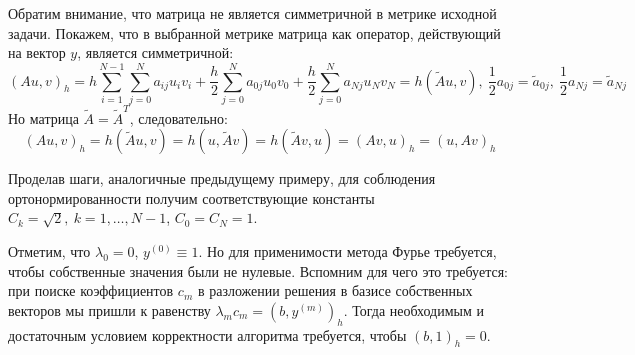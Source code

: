 \begin{example}
  Обратим внимание, что матрица не является симметричной в метрике
  исходной задачи. Покажем, что в выбранной метрике матрица как
  оператор, действующий на вектор $y$, является симметричной:
  \[(Au,v)_h=h\sum_{i=1}^{N-1}\sum_{j=0}^{N}a_{ij}u_iv_i+\frac{h}{2}\sum_{j=0}^{N}a_{0j}u_0v_0+\frac{h}{2}\sum_{j=0}^{N}a_{Nj}u_Nv_N=h(\tilde{A}u,v),\ \frac{1}{2}a_{0j}=\tilde{a}_{0j},\ \frac{1}{2}a_{Nj}=\tilde{a}_{Nj}\]
  Но матрица $\tilde{A}=\tilde{A}^T$, следовательно:
  \[(Au,v)_h=h(\tilde{A}u,v)=h(u,\tilde{A}v)=h(\tilde{A}v,u)=(Av,u)_h=(u,Av)_h\]

  Проделав шаги, аналогичные предыдущему примеру, для соблюдения ортонормированности
  получим соответствующие константы $C_k=\sqrt{2},\ k=1,\ldots,N-1$, $C_0=C_N=1$.

  Отметим, что $\lambda_0=0$, $y^{(0)}\equiv1$. Но для применимости метода Фурье
  требуется, чтобы собственные значения были не нулевые. Вспомним
  для чего это требуется: при поиске коэффициентов $c_m$
  в разложении решения в базисе собственных векторов мы пришли к
  равенству $\lambda_mc_m=(b,y^{(m)})_h$. Тогда необходимым
  и достаточным условием корректности алгоритма требуется, чтобы
  $(b,1)_h=0$.
\end{example}
